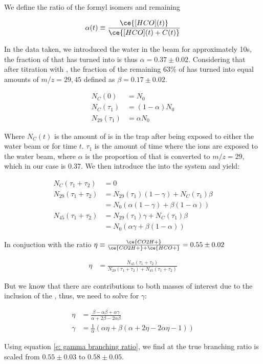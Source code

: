 We define the ratio of the formyl isomers and remaining 

\begin{equation}
	\alpha(t) \equiv \frac{\ce{[HCO](t)}}{\ce{[HCO](t) + C(t)}}
\end{equation}

In the data taken, we introduced the water in the beam for approximately 10s, the fraction of  that has turned into \ce{[HCO]+} is thus $\alpha = 0.37 \pm 0.02$. Considering that after titration with , the fraction of the remaining 63\% of  has turned into equal amounts of $m/z=29, 45$ defined as $\beta = 0.17 \pm 0.02$.

\begin{align}
	N_C(0) & = N_0 \\
	N_C(\tau_1) & = (1-\alpha)N_0 \\
	N_{29}(\tau_1) & = \alpha N_0
\end{align}

Where $N_C(t)$ is the amount of  is in the trap after being exposed to either the water beam or  for time $t$. $\tau_1$ is the amount of time where the ions are exposed to the water beam, where $\alpha$ is the proportion of  that is converted to $m/z=29$, which in our case is 0.37. We then introduce the  into the system and yield:

\begin{align}
	N_C(\tau_1 + \tau_2) & = 0 \\
	N_{29}(\tau_1 + \tau_2) & = N_{29}(\tau_1)(1-\gamma) + N_C(\tau_1)\beta \\
	& = N_0(\alpha(1-\gamma)+\beta(1-\alpha)) \\
	N_{45}(\tau_1 + \tau_2) & = N_{29}(\tau_1)\gamma + N_C(\tau_1)\beta \\
	& = N_0(\alpha \gamma+\beta(1-\alpha))
\end{align}

In conjuction with the ratio $\eta \equiv \frac{\ce{CO2H+}}{\ce{CO2H+} + \ce{HCO+}} = 0.55 \pm 0.02$

\begin{align}
	\eta & = \frac{N_{45}(\tau_1 + \tau_2)}{N_{29}(\tau_1 + \tau_2) + N_{45}(\tau_1 + \tau_2)}
\end{align}

But we know that there are contributions to both masses of interest due to the inclusion of the , thus, we need to solve for $\gamma$:

\begin{align}
	\eta & = \frac{\beta - \alpha \beta + \alpha \gamma}{\alpha + 2\beta - 2\alpha\beta} \\
	\gamma & = \frac{1}{\alpha} (\alpha \eta + \beta(\alpha + 2\eta - 2\alpha \eta - 1)) \label{e: gamma branching ratio}
\end{align}

Using equation \ref{e: gamma branching ratio}, we find at the true branching ratio is scaled from $0.55 \pm 0.03$ to $0.58 \pm 0.05$.

